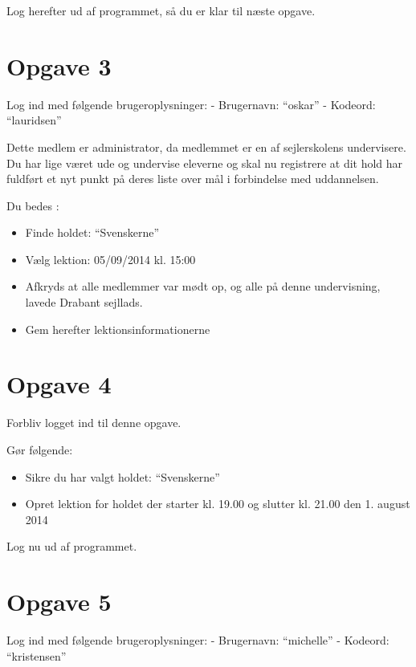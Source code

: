 Log herefter ud af programmet, så du er klar til næste opgave.
 
\section{Opgave 3}

Log ind med følgende brugeroplysninger: 
\newline - Brugernavn: ``oskar''
\newline - Kodeord: ``lauridsen''

Dette medlem er administrator, da medlemmet er en af sejlerskolens undervisere.
Du har lige været ude og undervise eleverne og skal nu registrere at dit hold har fuldført et nyt punkt på deres liste over mål i forbindelse med uddannelsen.

Du bedes :

\begin{itemize}
\item Finde holdet: ``Svenskerne''
\item Vælg lektion: 05/09/2014 kl. 15:00 
\item Afkryds at alle medlemmer var mødt op, og alle på denne undervisning, lavede Drabant sejllads.
\item Gem herefter lektionsinformationerne
\end{itemize}


\section{Opgave 4}

Forbliv logget ind til denne opgave.

Gør følgende:
\begin{itemize}
\item Sikre du har valgt holdet: ``Svenskerne''
\item Opret lektion for holdet der starter kl. 19.00 og slutter kl. 21.00 den 1. august 2014
\end{itemize}

Log nu ud af programmet.

\section{Opgave 5} 

Log ind med følgende brugeroplysninger: 
\newline - Brugernavn: ``michelle''
\newline - Kodeord: ``kristensen''

